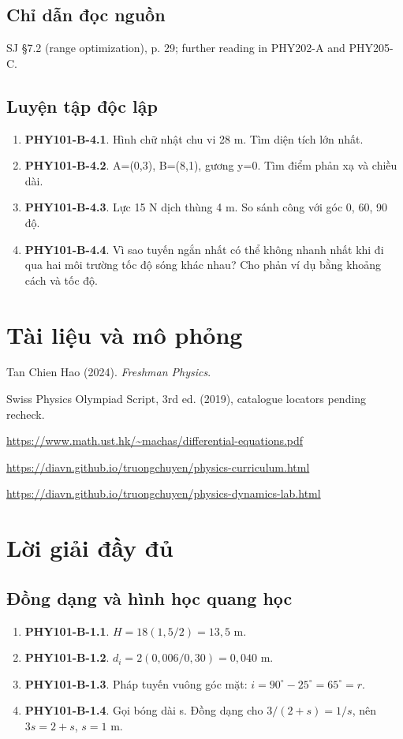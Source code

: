 \documentclass[11pt,a4paper,openany]{book}
\begin{document}
\section{Chỉ dẫn đọc nguồn}
SJ §7.2 (range optimization), p. 29; further reading in PHY202-A and PHY205-C.
\section{Luyện tập độc lập}
\begin{enumerate}
\item \textbf{PHY101-B-4.1}. Hình chữ nhật chu vi 28 m. Tìm diện tích lớn nhất.
\item \textbf{PHY101-B-4.2}. A=(0,3), B=(8,1), gương y=0. Tìm điểm phản xạ và chiều dài.
\item \textbf{PHY101-B-4.3}. Lực 15 N dịch thùng 4 m. So sánh công với góc 0, 60, 90 độ.
\item \textbf{PHY101-B-4.4}. Vì sao tuyến ngắn nhất có thể không nhanh nhất khi đi qua hai môi trường tốc độ sóng khác nhau? Cho phản ví dụ bằng khoảng cách và tốc độ.
\end{enumerate}
\chapter*{Tài liệu và mô phỏng}
Tan Chien Hao (2024). \textit{Freshman Physics}.\par
Swiss Physics Olympiad Script, 3rd ed. (2019), catalogue locators pending recheck.\par
\url{https://www.math.ust.hk/~machas/differential-equations.pdf}\par
\url{https://diavn.github.io/truongchuyen/physics-curriculum.html}\par
\url{https://diavn.github.io/truongchuyen/physics-dynamics-lab.html}
\appendix
\chapter{Lời giải đầy đủ}
\section{Đồng dạng và hình học quang học}
\begin{enumerate}
\item \textbf{PHY101-B-1.1}. $H=18(1{,}5/2)=13{,}5$ m.
\item \textbf{PHY101-B-1.2}. $d_i=2(0{,}006/0{,}30)=0{,}040$ m.
\item \textbf{PHY101-B-1.3}. Pháp tuyến vuông góc mặt: $i=90^\circ-25^\circ=65^\circ=r$.
\item \textbf{PHY101-B-1.4}. Gọi bóng dài s. Đồng dạng cho $3/(2+s)=1/s$, nên $3s=2+s$, $s=1$ m.
\end{enumerate}
\end{document}
